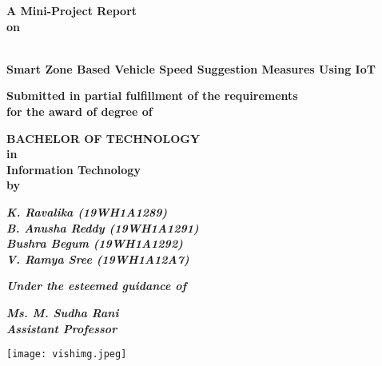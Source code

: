 \documentclass[a4paper,12pt, English]{article}
\begin{document}
\begin{titlepage}

\begin{center}
\vspace*{-1in}


\begin{Large}
\vspace*{0.1in}
\textbf{A Mini-Project Report\\on}
\end{Large}
\\
\vspace*{0.1in}
\textbf{\LARGE Smart Zone Based Vehicle Speed Suggestion Measures
Using IoT
 }

\begin{large}
\textbf{{Submitted in partial fulfillment of the requirements \\
for the award of degree of}}\\
\end{large}
\begin{large}
{\textbf{BACHELOR OF TECHNOLOGY \\ in\\ Information Technology\\by}}\\
\end{large}

\textit{\textbf{\large K. Ravalika  (19WH1A1289)}} \\
\textit{\textbf{\large B. Anusha Reddy (19WH1A1291) }} \\
\textit{\textbf{\large Bushra Begum (19WH1A1292)}} \\
\textit{\textbf{\large V. Ramya Sree (19WH1A12A7) }} \\
\begin{large}
\textit{\textbf{Under the esteemed guidance of}}\\
\end{large}
\textbf{\large \textit {Ms. M. Sudha Rani}}\\
\textbf{\large \textit {Assistant Professor}}\\
\begin{center}
\texttt{[image: vishimg.jpeg]}
\end{center}


\end{center}
\end{titlepage}
\end{document}
